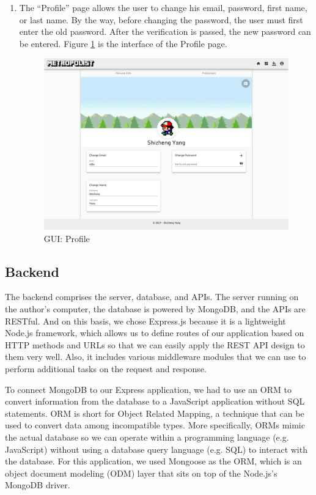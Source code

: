 \begin{enumerate}
  \item The ``Profile'' page allows the user to change his email, password, first name, or last name. By the way, before changing the password, the user must first enter the old password. After the verification is passed, the new password can be entered. Figure \ref{fig:GUI profile} is the interface of the Profile page.

  \begin{figure}[htbp]
  \centering
  \includegraphics[width=\textwidth]{section04/assets/GUI-profile.png}
  \caption[GUI: Profile]{\label{fig:GUI profile}GUI: Profile}
  \end{figure}
\end{enumerate}

\subsection{Backend}
The backend comprises the server, database, and APIs. The server running on the author's computer, the database is powered by MongoDB, and the APIs are RESTful. And on this basis, we chose Express.js because it is a lightweight Node.js framework, which allows us to define routes of our application based on HTTP methods and URLs so that we can easily apply the REST API design to them very well. Also, it includes various middleware modules that we can use to perform additional tasks on the request and response.

To connect MongoDB to our Express application, we had to use an ORM to convert information from the database to a JavaScript application without SQL statements. ORM is short for Object Related Mapping, a technique that can be used to convert data among incompatible types. More specifically, ORMs mimic the actual database so we can operate within a programming language (e.g. JavaScript) without using a database query language (e.g. SQL) to interact with the database. For this application, we used Mongoose as the ORM, which is an object document modeling (ODM) layer that sits on top of the Node.js's MongoDB driver.

